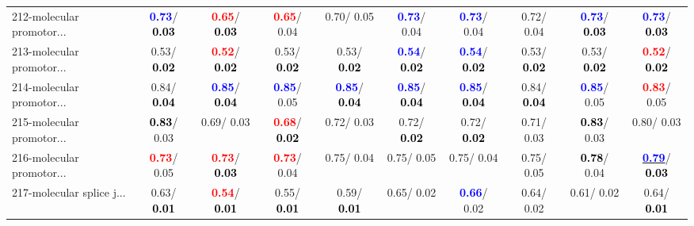 \begin{table}[h]
\begin{center}
{\begin{tabular}{lc|c|c|c|c|c|c|c|c}
212-molecular promotor... & \textcolor{blue}{\textbf{  0.73}}/\textcolor{black}{\textbf{  0.03}} & \textcolor{red}{\textbf{  0.65}}/\textcolor{black}{\textbf{  0.03}} & \textcolor{red}{\textbf{  0.65}}/  0.04 &   0.70/  0.05 & \textcolor{blue}{\textbf{  0.73}}/  0.04 & \textcolor{blue}{\textbf{  0.73}}/  0.04 &   0.72/  0.04 & \textcolor{blue}{\textbf{  0.73}}/\textcolor{black}{\textbf{  0.03}} & \textcolor{blue}{\textbf{  0.73}}/\textcolor{black}{\textbf{  0.03}} \\
213-molecular promotor... &   0.53/\textcolor{black}{\textbf{  0.02}} & \textcolor{red}{\textbf{  0.52}}/\textcolor{black}{\textbf{  0.02}} &   0.53/\textcolor{black}{\textbf{  0.02}} &   0.53/\textcolor{black}{\textbf{  0.02}} & \textcolor{blue}{\textbf{  0.54}}/\textcolor{black}{\textbf{  0.02}} & \textcolor{blue}{\textbf{  0.54}}/\textcolor{black}{\textbf{  0.02}} &   0.53/\textcolor{black}{\textbf{  0.02}} &   0.53/\textcolor{black}{\textbf{  0.02}} & \textcolor{red}{\textbf{  0.52}}/\textcolor{black}{\textbf{  0.02}} \\ \hline
214-molecular promotor... &   0.84/\textcolor{black}{\textbf{  0.04}} & \textcolor{blue}{\textbf{  0.85}}/\textcolor{black}{\textbf{  0.04}} & \textcolor{blue}{\textbf{  0.85}}/  0.05 & \textcolor{blue}{\textbf{  0.85}}/\textcolor{black}{\textbf{  0.04}} & \textcolor{blue}{\textbf{  0.85}}/\textcolor{black}{\textbf{  0.04}} & \textcolor{blue}{\textbf{  0.85}}/\textcolor{black}{\textbf{  0.04}} &   0.84/\textcolor{black}{\textbf{  0.04}} & \textcolor{blue}{\textbf{  0.85}}/  0.05 & \textcolor{red}{\textbf{  0.83}}/  0.05 \\
215-molecular promotor... & \textcolor{black}{\textbf{  0.83}}/  0.03 &   0.69/  0.03 & \textcolor{red}{\textbf{  0.68}}/\textcolor{black}{\textbf{  0.02}} &   0.72/  0.03 &   0.72/\textcolor{black}{\textbf{  0.02}} &   0.72/\textcolor{black}{\textbf{  0.02}} &   0.71/  0.03 & \textcolor{black}{\textbf{  0.83}}/  0.03 &   0.80/  0.03 \\
216-molecular promotor... & \textcolor{red}{\textbf{  0.73}}/  0.05 & \textcolor{red}{\textbf{  0.73}}/\textcolor{black}{\textbf{  0.03}} & \textcolor{red}{\textbf{  0.73}}/  0.04 &   0.75/  0.04 &   0.75/  0.05 &   0.75/  0.04 &   0.75/  0.05 & \textcolor{black}{\textbf{  0.78}}/  0.04 & \underline{\textcolor{blue}{\textbf{  0.79}}}/\textcolor{black}{\textbf{  0.03}} \\
217-molecular splice j... &   0.63/\textcolor{black}{\textbf{  0.01}} & \textcolor{red}{\textbf{  0.54}}/\textcolor{black}{\textbf{  0.01}} &   0.55/\textcolor{black}{\textbf{  0.01}} &   0.59/\textcolor{black}{\textbf{  0.01}} &   0.65/  0.02 & \textcolor{blue}{\textbf{  0.66}}/  0.02 &   0.64/  0.02 &   0.61/  0.02 &   0.64/\textcolor{black}{\textbf{  0.01}} \\

\end{tabular}}
\end{center}
\end{table}
